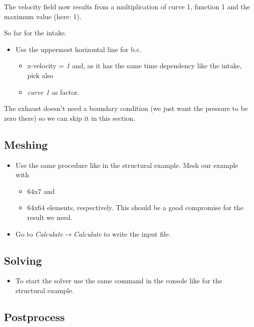 The velocity field now results from a multiplication of curve 1, function
1 and the maximum value (here: 1).

So far for the intake.

\begin{itemize}
\item Use the uppermost horizontal line for b.c. 

\begin{itemize}
\item x-velocity = \emph{1} and, as it has the same time dependency like
the intake, pick also 
\item \emph{curve 1} as factor.
\end{itemize}
\end{itemize}
The exhaust doesn't need a boundary condition (we just want the pressure
to be zero there) so we can skip it in this section. 


\subsection{Meshing}

\begin{itemize}
\item Use the same procedure like in the structural example. Mesh our example
with 

\begin{itemize}
\item 64x7 and 
\item 64x64 elements, respectively. This should be a good compromise for
the result we need.
\end{itemize}
\item Go to \emph{Calculate$\to$Calculate} to write the input file.
\end{itemize}

\subsection{Solving}

\begin{itemize}
\item To start the solver use the same command in the console like for the
structural example.
\end{itemize}

\subsection{Postprocess}

